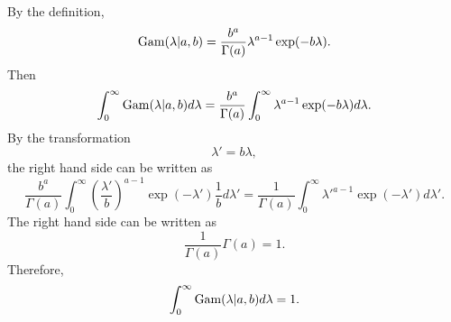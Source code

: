 \subsection{}
\label{2.41}
By the definition,
%
\begin{equation}
{\rm Gam} (\lambda | a, b)
=
\frac{b ^ a}{\Gamma(a)} 
\lambda ^ {a - 1}
\exp (- b \lambda).
\end{equation}
%
Then
%
\begin{equation}
\int_{0}^{\infty} 
{\rm Gam} (\lambda | a, b)
d\lambda
=
\frac{b ^ a}{\Gamma(a)} 
\int_{0}^{\infty}
\lambda ^ {a - 1}
\exp (- b \lambda)
d\lambda.
\end{equation}
%
By the transformation
%
\begin{equation}
\lambda'
= 
b 
\lambda,
\end{equation}
%
the right hand side can be written as
%
\begin{equation}
\frac{b ^ a}{\Gamma(a)} 
\int_{0}^{\infty}
\left(
	\frac{\lambda'}{b}
\right) ^ {a - 1}
\exp (- \lambda')
\frac{1}{b}
d\lambda'
=
\frac{1}{\Gamma(a)}
\int_{0}^{\infty}
{\lambda'} ^ {a - 1}
\exp (- \lambda')
d\lambda'.
\end{equation}
%
The right hand side can be written as
%
\begin{equation}
\frac{1}{\Gamma(a)}
\Gamma(a)
=
1.
\end{equation}
%
Therefore,
%
\begin{equation}
\int_{0}^{\infty} 
{\rm Gam} (\lambda | a, b)
d\lambda
=
1.
\end{equation}
%


